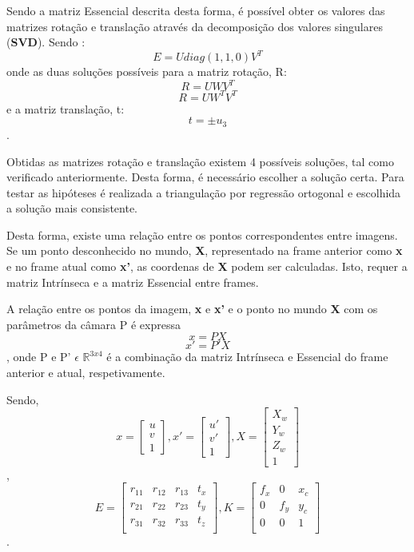 	Sendo a matriz Essencial descrita desta forma, é possível obter os valores das matrizes rotação e translação através da decomposição dos valores singulares (\textbf{SVD}). Sendo : \[ E = U diag(1,1,0) V^{T} \] onde as duas soluções possíveis para a matriz rotação, R: \[ R = UWV^T \] \[ R = UW^TV^T \] e a matriz translação, t: \[ t = \pm u_3 \].
	
	
	Obtidas as matrizes rotação e translação existem 4 possíveis soluções, tal como verificado anteriormente. Desta forma, é necessário escolher a solução certa. Para testar as hipóteses é realizada a triangulação por regressão ortogonal e escolhida a solução mais consistente.
	
	Desta forma, existe uma relação entre os pontos correspondentes entre imagens. Se um ponto desconhecido no mundo, \textbf{X}, representado na frame anterior como \textbf{x} e no frame atual como \textbf{x'}, as coordenas de \textbf{X} podem ser calculadas. Isto, requer a matriz Intrínseca e a matriz Essencial entre frames.
	
	A relação entre os pontos da imagem, \textbf{x} e \textbf{x'} e o ponto no mundo \textbf{X} com os parâmetros da câmara P é expressa \[ x = P X \] \[ x' = P'X \], onde P e P' $\epsilon$  $\mathbb{R}^{3x4}$ é a combinação da matriz Intrínseca e Essencial do frame anterior e atual, respetivamente.
	
	Sendo, \[ x =  \left[ \begin{array}{ccc} u \\ v \\ 1 \end{array} \right],  x' =  \left[ \begin{array}{ccc} u' \\ v' \\ 1 \end{array} \right] ,  X =  \left[ \begin{array}{cccc} X_w \\ Y_w \\ Z_w \\ 1 \end{array} \right] \], \[ E =  \left[ \begin{array}{cccc} r_{11} & r_{12} & r_{13} & t_{x} \\ r_{21} & r_{22} & r_{23} & t_{y} \\ r_{31} & r_{32} & r_{33} & t_{z} \\ \end{array} \right] , K =  \left[ \begin{array}{ccc} f_x & 0 & x_c \\ 0 & f_y & y_c \\ 0 & 0 & 1 \\ \end{array} \right] \].
	
